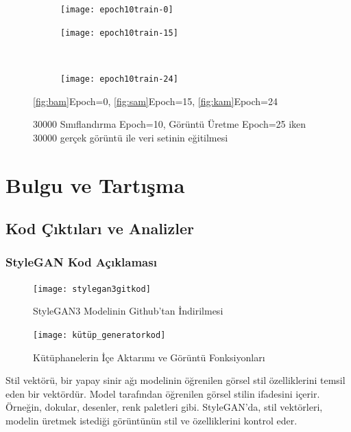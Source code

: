 \documentclass[12pt, a4paper]{article}
\begin{document}
	\begin{figure}[htbp]
		\centering
		\begin{subfigure}{0.40\textwidth}
			\centering
			\texttt{[image: epoch10train-0]}
			\caption{}
			\label{fig:bam}
		\end{subfigure}
		\hfill
		\begin{subfigure}{0.40\textwidth}
			\centering
			\texttt{[image: epoch10train-15]}
			\caption{}
			\label{fig:sam}
		\end{subfigure}
		\\
		\begin{subfigure}{0.40\textwidth}
			\centering
			\texttt{[image: epoch10train-24]}
			\caption{}
			\label{fig:kam}
		\end{subfigure}
		\caption{30000 Sınıflandırma Epoch=10, Görüntü Üretme Epoch=25 iken 30000 gerçek görüntü ile veri setinin eğitilmesi}
		\eqref{fig:bam}Epoch=0,
		\eqref{fig:sam}Epoch=15,
		\eqref{fig:kam}Epoch=24
	\end{figure}
	\FloatBarrier
	
	\clearpage
	\section{Bulgu ve Tartışma}
	
	\subsection{Kod Çıktıları ve Analizler}
	
	\subsubsection{StyleGAN Kod Açıklaması}
	\begin{figure}[h]
		\centering
		\texttt{[image: stylegan3gitkod]}
		\label{stylegan3gitkod}
		\caption{StyleGAN3 Modelinin Github'tan İndirilmesi\cite{t81_558_deep_learning}}
	\end{figure}
	\FloatBarrier
	\begin{figure}[ht]
		\centering
		\texttt{[image: kütüp\_generatorkod]}
		\label{kütüp_generatorkod}
		\caption{Kütüphanelerin İçe Aktarımı ve Görüntü Fonksiyonları}
	\end{figure} 
	\FloatBarrier
	Stil vektörü, bir yapay sinir ağı modelinin öğrenilen görsel stil özelliklerini temsil eden bir vektördür. Model tarafından öğrenilen görsel stilin ifadesini içerir. Örneğin, dokular, desenler, renk paletleri gibi. StyleGAN'da, stil vektörleri, modelin üretmek istediği görüntünün stil ve özelliklerini kontrol
	eder.
	
\end{document}

